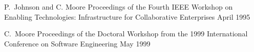 \documentclass[11pt,letterpaper,sans]{moderncv} %
\begin{document}
          {P.~Johnson and C. Moore}
          {Proceedings of the Fourth IEEE Workshop on Enabling Technologies: Infrastructure for Collaborative Enterprises}
          {April 1995}

          {C.~Moore}
          {Proceedings of the Doctoral Workshop from the 1999
            International Conference on Software Engineering}
          {May 1999}



\end{document}
